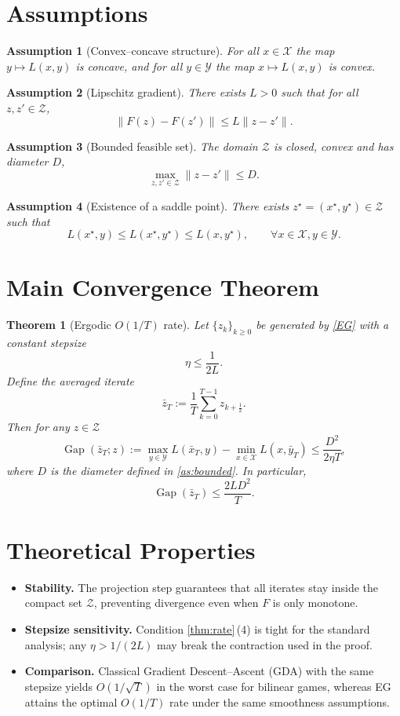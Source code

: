 \documentclass{article}
\newtheorem{theorem}{Theorem}
\newtheorem{assumption}{Assumption}
\newcommand{\gap}{\operatorname{Gap}}
\begin{document}
\section*{Assumptions}
\begin{assumption}[Convex–concave structure]\label{as:convconc}
For all $x\in\mathcal{X}$ the map $y\mapsto L(x,y)$ is concave, and for all $y\in\mathcal{Y}$ the map $x\mapsto L(x,y)$ is convex.
\end{assumption}
\begin{assumption}[Lipschitz gradient]\label{as:smooth}
There exists $L>0$ such that for all $z,z'\in\mathcal{Z}$,
\[
\|F(z)-F(z')\|\le L\|z-z'\|.
\tag{1}
\]
\end{assumption}
\begin{assumption}[Bounded feasible set]\label{as:bounded}
The domain $\mathcal{Z}$ is closed, convex and has diameter $D$,
\[
\max_{z,z'\in\mathcal{Z}}\|z-z'\|\le D.
\tag{2}
\]
\end{assumption}
\begin{assumption}[Existence of a saddle point]\label{as:saddle}
There exists $z^{\star}=(x^{\star},y^{\star})\in\mathcal{Z}$ such that
\[
L(x^{\star},y)\le L(x^{\star},y^{\star})\le L(x,y^{\star}),\qquad\forall x\in\mathcal{X},y\in\mathcal{Y}.
\tag{3}
\]
\end{assumption}

\section*{Main Convergence Theorem}
\begin{theorem}[Ergodic $O(1/T)$ rate]\label{thm:rate}
Let $\{z_{k}\}_{k\ge0}$ be generated by \eqref{EG} with a constant stepsize 
\[
\eta\le \frac{1}{2L}.
\tag{4}
\]
Define the averaged iterate
\[
\bar z_{T}:=\frac{1}{T}\sum_{k=0}^{T-1}z_{k+\frac12}.
\]
Then for any $z\in\mathcal{Z}$
\[
\gap(\bar z_{T};z):=
\max_{y\in\mathcal{Y}}L(\bar x_{T},y)-\min_{x\in\mathcal{X}}L(x,\bar y_{T})
\le \frac{D^{2}}{2\eta T},
\tag{5}
\]
where $D$ is the diameter defined in \eqref{as:bounded}. In particular,
\[
\gap(\bar z_{T})\le \frac{2L D^{2}}{T}.
\tag{6}
\]
\end{theorem}

\section*{Theoretical Properties}
\begin{itemize}
\item \textbf{Stability.} The projection step guarantees that all iterates stay inside the compact set $\mathcal{Z}$, preventing divergence even when $F$ is only monotone.
\item \textbf{Stepsize sensitivity.} Condition \eqref{thm:rate}\,(4) is tight for the standard analysis; any $\eta>1/(2L)$ may break the contraction used in the proof.
\item \textbf{Comparison.} Classical Gradient Descent–Ascent (GDA) with the same stepsize yields $O(1/\sqrt{T})$ in the worst case for bilinear games, whereas EG attains the optimal $O(1/T)$ rate under the same smoothness assumptions.
\end{itemize}
\end{document}
